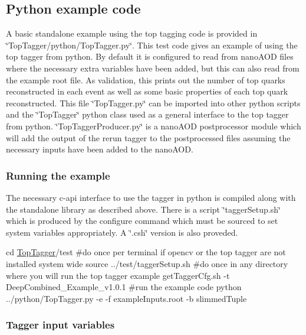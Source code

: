\subsection*{Python example code}

A basic standalone example using the top tagging code is provided in \char`\"{}\-Top\-Tagger/python/\-Top\-Tagger.\-py\char`\"{}. This test code gives an example of using the top tagger from python. By default it is configured to read from nano\-A\-O\-D files where the necessary extra variables have been added, but this can also read from the example root file. As validation, this prints out the number of top quarks reconstructed in each event as well as some basic properties of each top quark reconstructed. This file \char`\"{}\-Top\-Tagger.\-py\char`\"{} can be imported into other python scripts and the \char`\"{}\-Top\-Tagger\char`\"{} python class used as a general interface to the top tagger from python. \char`\"{}\-Top\-Tagger\-Producer.\-py\char`\"{} is a nano\-A\-O\-D postprocessor module which will add the output of the rerun tagger to the postprocessed files assuming the necessary inputs have been added to the nano\-A\-O\-D.

\subsubsection*{Running the example}

The necessary c-\/api interface to use the tagger in python is compiled along with the standalone library as described above. There is a script \char`\"{}tagger\-Setup.\-sh\char`\"{} which is produced by the configure command which must be sourced to set system variables appropriately. A \char`\"{}.\-csh\char`\"{} version is also proveded.


\begin{DoxyCode}
cd \hyperlink{classTopTagger}{TopTagger}/test
\textcolor{preprocessor}{#do once per terminal if opencv or the top tagger are not installed system wide}
\textcolor{preprocessor}{}source ../test/taggerSetup.sh
\textcolor{preprocessor}{#do once in any directory where you will run the top tagger example}
\textcolor{preprocessor}{}getTaggerCfg.sh -t DeepCombined\_Example\_v1.0.1
\textcolor{preprocessor}{#run the example code}
\textcolor{preprocessor}{python ../python/TopTagger.py -e -f exampleInputs.root -b slimmedTuple}
\end{DoxyCode}


\subsubsection*{Tagger input variables}

